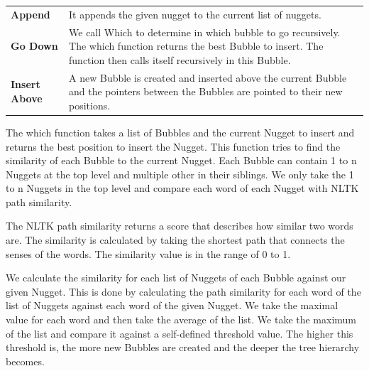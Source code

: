 
\begin{table}[H]
	\centering
	\begin{tabularx}{\textwidth}{lX}
		\textbf{Append} & It appends the given nugget to the current list of nuggets. \\
		\textbf{Go Down} & We call Which to determine in which bubble to go recursively. The which function returns the best Bubble to insert. The function then calls itself recursively in this Bubble.\\
		\textbf{Insert Above} & A new Bubble is created and inserted above the current Bubble and the pointers between the Bubbles are pointed to their new positions.
	\end{tabularx}
\end{table}



The which function takes a list of Bubbles and the current Nugget to insert and returns the best position to insert the Nugget. This function tries to find the similarity of each Bubble to the current Nugget. Each Bubble can contain 1 to n Nuggets at the top level and multiple other in their siblings. We only take the 1 to n Nuggets in the top level and compare each word of each Nugget with NLTK path similarity.

The NLTK path similarity returns a score that describes how similar two words are. The similarity is calculated by taking the shortest path that connects the senses of the words. The similarity value is in the range of 0 to 1.

We calculate the similarity for each list of Nuggets of each Bubble against our given Nugget. This is done by calculating the path similarity for each word of the list of Nuggets against each word of the given Nugget. We take the maximal value for each word and then take the average of the list. We take the maximum of the list and compare it against a self-defined threshold value. The higher this threshold is, the more new Bubbles are created and the deeper the tree hierarchy becomes.


